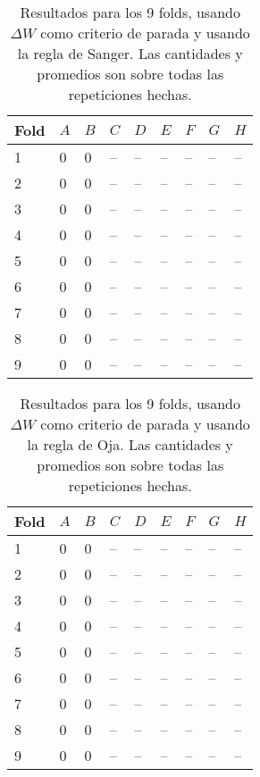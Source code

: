 \documentclass[informe.tex]{subfiles}
\begin{document}
      
      \begin{table}[h]
	\centering
	\begin{tabular}{|l|l|l|l|l|l|l|l|l|} \hline
	Fold & $A$ & $B$ & $C$ & $D$ & $E$ & $F$ & $G$ & $H$ \\ \hline
	1& 0 & 0 & -- & -- & -- & -- & -- & -- \\ \hline
	2& 0 & 0 & -- & -- & -- & -- & -- & -- \\ \hline
	3& 0 & 0 & -- & -- & -- & -- & -- & -- \\ \hline
	4& 0 & 0 & -- & -- & -- & -- & -- & -- \\ \hline
	5& 0 & 0 & -- & -- & -- & -- & -- & -- \\ \hline
	6& 0 & 0 & -- & -- & -- & -- & -- & -- \\ \hline
	7& 0 & 0 & -- & -- & -- & -- & -- & -- \\ \hline
	8& 0 & 0 & -- & -- & -- & -- & -- & -- \\ \hline
	9& 0 & 0 & -- & -- & -- & -- & -- & -- \\ \hline
	\end{tabular}
	\caption{Resultados para los 9 folds, usando $\Delta W$ como criterio de parada y usando la regla de Sanger. Las cantidades y promedios son sobre todas las repeticiones hechas.}
	\label{tab:pesos_sanger}
      \end{table}      
      

      \begin{table}[h]
	\centering
	\begin{tabular}{|l|l|l|l|l|l|l|l|l|} \hline
	Fold & $A$ & $B$ & $C$ & $D$ & $E$ & $F$ & $G$ & $H$ \\ \hline
	1& 0 & 0 & -- & -- & -- & -- & -- & -- \\ \hline
	2& 0 & 0 & -- & -- & -- & -- & -- & -- \\ \hline
	3& 0 & 0 & -- & -- & -- & -- & -- & -- \\ \hline
	4& 0 & 0 & -- & -- & -- & -- & -- & -- \\ \hline
	5& 0 & 0 & -- & -- & -- & -- & -- & -- \\ \hline
	6& 0 & 0 & -- & -- & -- & -- & -- & -- \\ \hline
	7& 0 & 0 & -- & -- & -- & -- & -- & -- \\ \hline
	8& 0 & 0 & -- & -- & -- & -- & -- & -- \\ \hline
	9& 0 & 0 & -- & -- & -- & -- & -- & -- \\ \hline
	\end{tabular}
	\caption{Resultados para los 9 folds, usando $\Delta W$ como criterio de parada y usando la regla de Oja. Las cantidades y promedios son sobre todas las repeticiones hechas.}
	\label{tab:pesos_oja}
      \end{table}            
      
\end{document}
